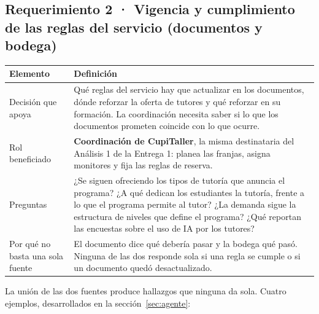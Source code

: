 \documentclass[11pt,letterpaper]{article}
\begin{document}
\subsection{Requerimiento 2 · Vigencia y cumplimiento de las reglas del servicio (documentos y bodega)}

\begin{table}[H]\small\renewcommand{\arraystretch}{1.2}
\begin{tabularx}{\textwidth}{>{\raggedright\arraybackslash}p{}L}
\toprule
\textbf{Elemento} & \textbf{Definición} \\
\midrule
Decisión que apoya & Qué reglas del servicio hay que actualizar en los documentos, dónde reforzar la oferta de tutores y qué reforzar en su formación. La coordinación necesita saber si lo que los documentos prometen coincide con lo que ocurre. \\
Rol beneficiado & \textbf{Coordinación de CupiTaller}, la misma destinataria del Análisis 1 de la Entrega 1: planea las franjas, asigna monitores y fija las reglas de reserva. \\
Preguntas & ¿Se siguen ofreciendo los tipos de tutoría que anuncia el programa? ¿A qué dedican los estudiantes la tutoría, frente a lo que el programa permite al tutor? ¿La demanda sigue la estructura de niveles que define el programa? ¿Qué reportan las encuestas sobre el uso de IA por los tutores? \\
Por qué no basta una sola fuente & El documento dice qué debería pasar y la bodega qué pasó. Ninguna de las dos responde sola si una regla se cumple o si un documento quedó desactualizado. \\
\bottomrule
\end{tabularx}
\end{table}


La unión de las dos fuentes produce hallazgos que ninguna da sola. Cuatro ejemplos, desarrollados en la sección~\ref{sec:agente}:
\end{document}
